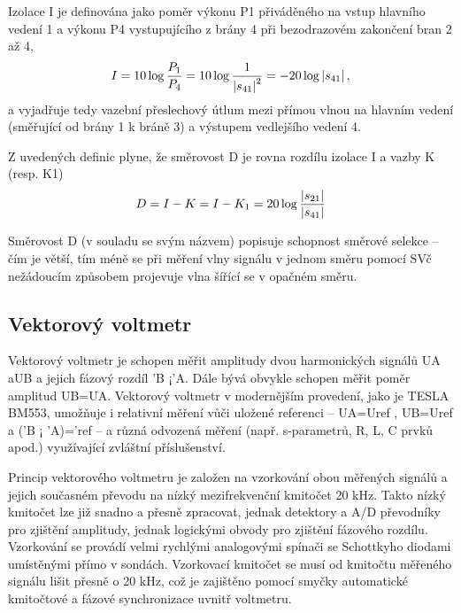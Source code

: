         Izolace I je definována jako poměr výkonu P1 přiváděného na vstup hlavního vedení 1 a výkonu P4 
        vystupujícího z brány 4 při bezodrazovém zakončení bran 2 až 4,
        \begin{equation}\label{RA:eq_smith13}
          I = 10\log\frac{P_1}{P_4} 
            = 10\log\frac{1}{\left\lvert s_{41}\right\rvert^2} = -20\log\left\lvert s_{41}\right\rvert, 
        \end{equation} 
        a vyjadřuje tedy vazební přeslechový útlum mezi přímou vlnou na hlavním vedení (směřující od brány 1 
        k bráně 3) a výstupem vedlejšího vedení 4.
  
        Z uvedených definic plyne, že směrovost D je rovna rozdílu izolace I a vazby K (resp. K1)
        \begin{equation}\label{RA:eq_smith14}
          D = I - K = I - K_1 = 20\log\frac{\left\lvert s_{21}\right\rvert}{\left\lvert s_{41}\right\rvert}
        \end{equation}  
  
        Směrovost D (v souladu se svým názvem) popisuje schopnost směrové selekce – čím je větší, tím méně se 
        při měření vlny signálu v jednom směru pomocí SVč nežádoucím způsobem projevuje vlna šířící se v 
        opačném směru.
  
      \subsection{Vektorový voltmetr}
        Vektorový voltmetr je schopen měřit amplitudy dvou harmonických signálů UA aUB a jejich fázový rozdíl 
        'B ¡'A. Dále bývá obvykle schopen měřit poměr amplitud UB=UA. Vektorový voltmetr v modernějším 
        provedení, jako je TESLA BM553, umožňuje i relativní měření vůči uložené referenci – UA=Uref , 
        UB=Uref a ('B ¡ 'A)='ref – a různá odvozená měření (např. s-parametrů, R, L, C prvků apod.) 
        využívající zvláštní příslušenství.
  
        Princip vektorového voltmetru je založen na vzorkování obou měřených signálů a jejich současném 
        převodu na nízký mezifrekvenční kmitočet 20 kHz. Takto nízký kmitočet lze již snadno a přesně 
        zpracovat, jednak detektory a A/D převodníky pro zjištění amplitudy, jednak logickými obvody pro 
        zjištění fázového rozdílu. Vzorkování se provádí velmi rychlými analogovými spínači se Schottkyho 
        diodami umístěnými přímo v sondách. Vzorkovací kmitočet se musí od kmitočtu měřeného signálu lišit 
        přesně o 20 kHz, což je zajištěno pomocí smyčky automatické kmitočtové a fázové synchronizace uvnitř 
        voltmetru.
      

  
\printbibliography[heading=subbibliography]